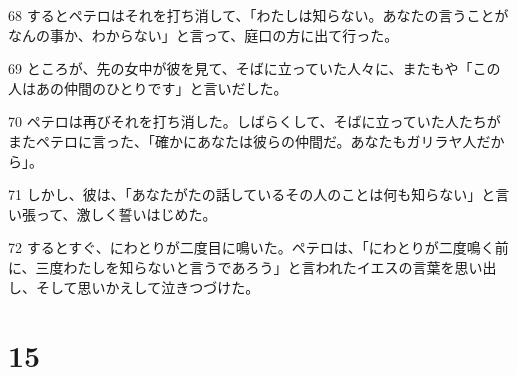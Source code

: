 \par 68 するとペテロはそれを打ち消して、「わたしは知らない。あなたの言うことがなんの事か、わからない」と言って、庭口の方に出て行った。
\par 69 ところが、先の女中が彼を見て、そばに立っていた人々に、またもや「この人はあの仲間のひとりです」と言いだした。
\par 70 ペテロは再びそれを打ち消した。しばらくして、そばに立っていた人たちがまたペテロに言った、「確かにあなたは彼らの仲間だ。あなたもガリラヤ人だから」。
\par 71 しかし、彼は、「あなたがたの話しているその人のことは何も知らない」と言い張って、激しく誓いはじめた。
\par 72 するとすぐ、にわとりが二度目に鳴いた。ペテロは、「にわとりが二度鳴く前に、三度わたしを知らないと言うであろう」と言われたイエスの言葉を思い出し、そして思いかえして泣きつづけた。

\chapter{15}

